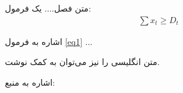 متن فصل....
یک فرمول:
\begin{align}
\sum x_t \geq D_t
\label{eq1}
\end{align}

اشاره به فرمول \eqref{eq1} ...

متن انگلیسی را نیز می‌توان به کمک  نوشت.

اشاره به منبع: \cite{wood_ethereum_nodate}
 
